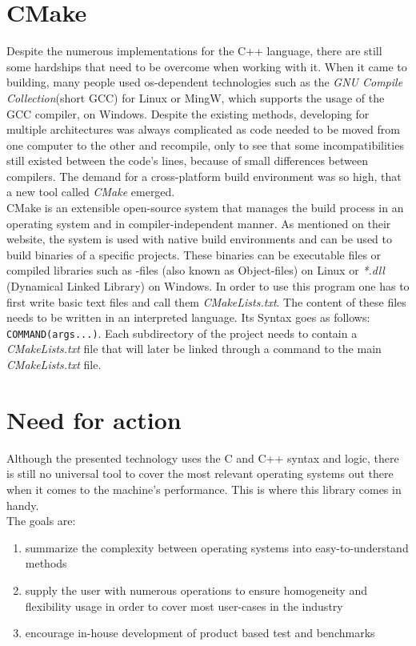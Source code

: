 \section{CMake}
Despite the numerous implementations for the C++ language, there are still some hardships that need to be overcome when working with it. When it came to building, many people used os-dependent technologies such as the \textit{GNU Compile Collection}(short GCC) for Linux\cite{gcc} or MingW, which supports the usage of the GCC compiler, on Windows\cite{mingw}. Despite the existing methods, developing for multiple architectures was always complicated as code needed to be moved from one computer to the other and recompile, only to see that some incompatibilities still existed between the code's lines, because of small differences between compilers. The demand \dq for a cross-platform build environment\dq{} was so high, that a new tool called \textit{CMake} emerged.\\
\dq CMake is an extensible open-source system that manages the build process in an operating system and in compiler-independent manner\dq{}. As mentioned on their website, the system is used with native build environments and can be used to build binaries of a specific projects. These binaries can be executable files or compiled libraries such as -files (also known as Object-files) on Linux or \textit{*.dll} (Dynamical Linked Library) on Windows. In order to use this program one has to first write basic text files and call them \textit{CMakeLists.txt}. The content of these files needs to be written in an interpreted language. Its Syntax goes as follows: \texttt{COMMAND(args...)}. Each subdirectory of the project needs to contain a \textit{CMakeLists.txt} file that will later be linked through a command to the main \textit{CMakeLists.txt} file\cite{cmake-overview}. 

\section{Need for action}
Although the presented technology uses the C and C++ syntax and logic, there is still no universal tool to cover the most relevant operating systems out there when it comes to the machine's performance. This is where this library comes in handy.\\
The goals are:
\begin{enumerate}
	\item summarize the complexity between operating systems into easy-to-understand methods
	\item supply the user with numerous operations to ensure homogeneity and flexibility usage in order to cover most user-cases in the industry 
	\item  encourage in-house development of product based test and benchmarks  
\end{enumerate}
